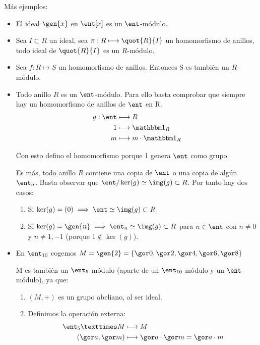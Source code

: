 Más ejemplos:
\begin{example}
	\begin{itemize}
		\item El ideal $\gen{x}$ en $\ent[x]$ es un $\ent$-módulo.
		\item Sea $I \subset R$ un ideal, sea $\pi:R\longmapsto \quot{R}{I}$ un homomorfismo de anillos, todo ideal de $\quot{R}{I}$ es un $R$-módulo.
		\item Sea $f:R \longmapsto S$ un homomorfismo de anillos. Entonces S es también un $R$-módulo.
		\item Todo anillo $R$ es un $\ent$-módulo. Para ello basta comprobar que siempre hay un homomorfismo de anillos de $\ent$ en R.
		\begin{align*}
			g:\ent &\longmapsto  R\\
			1 & \longmapsto \one_R \\
			m & \longmapsto  m\cdot \one_R \\
		\end{align*}

		Con esto defino el homomorfismo porque 1 genera $\ent$ como grupo.

		Es más, todo anillo $R$ contiene una copia de $\ent$ o una copia de algún $\ent_n$. Basta observar que $\ent/\ker(g) \simeq \img(g) \subset R$. Por tanto hay dos casos:
		\begin{enumerate}
			\item Si $\ker(g)=(0) \implies \ent \simeq \img(g) \subset R$
			\item Si $\ker(g)=\gen{n}\implies \ent_n \simeq \img(g) \subset R$ para $n\in \ent$ con $n\neq0$ y $n\neq 1,-1$ (porque $1\notin \ker(g)$).
		\end{enumerate}
	\item En $\ent_{10}$ cogemos $M=\gen{2}=\{\cls{0},\cls{2},\cls{4},\cls{6},\cls{8} \}$

	M es también un $\ent_5$-módulo (aparte de un $\ent_{10}$-módulo y un $\ent$-módulo), ya que:
	\begin{enumerate}
		\item $(M,+)$ es un grupo abeliano, al ser ideal.
		\item Definimos la operación externa:
		\begin{align*}
			\ent_5 × M & \longmapsto  M \\
			(\cls{a},\cls{m}) & \longmapsto  \cls{a}\cdot \cls{m} =\cls{a\cdot m} \\
		\end{align*}


\end{enumerate}
\end{itemize}
\end{example}
